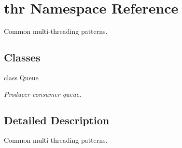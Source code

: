 \hypertarget{namespacethr}{\section{thr Namespace Reference}
\label{namespacethr}
}


Common multi-\/threading patterns.  


\subsection*{Classes}
\begin{DoxyCompactItemize}
\item 
class \hyperlink{classthr_1_1_queue}{Queue}
\begin{DoxyCompactList}\small\item\em Producer-\/consumer queue. \end{DoxyCompactList}\end{DoxyCompactItemize}


\subsection{Detailed Description}
Common multi-\/threading patterns. 
